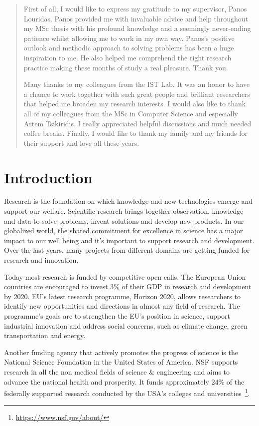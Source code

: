 \documentclass[12pt]{report}
\begin{document}
\renewcommand{\abstractname}{Acknowledgments}
\begin{abstract}
First of all, I would like to express my gratitude to my supervisor, Panos
Louridas. Panos provided me with invaluable advice and help throughout my MSc
thesis with his profound knowledge and a seemingly never-ending patience whilst
allowing me to work in my own way. Panos’s positive outlook and methodic approach
to solving problems has been a huge inspiration to me. He also helped me
comprehend the right research practice making these months of study a real
pleasure. Thank you.

Many thanks to my colleagues from the IST Lab. It was an honor to have a chance
to work together with such great people and brilliant researchers that helped me
broaden my research interests. I would also like to thank all of my colleagues
from the MSc in Computer Science and especially Artem Tsikiridis. I really
appreciated helpful discussions and much needed coffee breaks. Finally, I would
like to thank my family and my friends for their support and love all these
years.
\end{abstract}

\section{Introduction}
Research is the foundation on which knowledge and new technologies emerge and
support our welfare. Scientific research brings together observation, knowledge
and data to solve problems, invent solutions and develop new products. In our
globalized world, the shared commitment for excellence in science has a major
impact to our well being and it's important to support research and development.
Over the last years, many projects from different domains are getting funded for
research and innovation.

Today most research is funded by competitive open calls. 
The European Union countries are encouraged to
invest 3\% of their GDP in research and development by 2020. EU's
latest research programme, Horizon 2020, allows researchers to
identify new opportunities and directions in almost any field of
research. The programme's goals are to strengthen the EU's position in
science, support industrial innovation and address social concerns,
such as climate change, green transportation and energy.

Another funding agency that actively promotes the progress of science
is the National Science Foundation in the United States of America.
NSF supports research in all the non medical fields of science \&
engineering and aims to advance the national health and prosperity. It
funds approximately 24\% of the federally supported research
conducted by the USA's colleges and universities~\footnote{\url{https://www.nsf.gov/about/}}.
\end{document}
